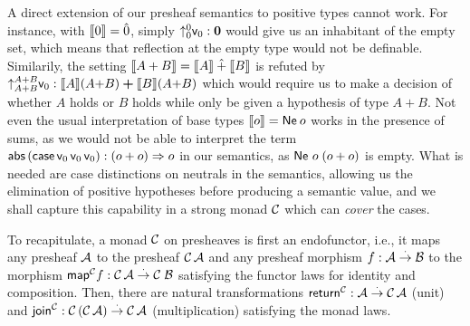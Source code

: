 \documentclass[a4paper,USenglish,cleveref, autoref]{lipics-v2019}
\begin{document}
A direct extension of our presheaf semantics to positive types cannot
work.  For instance, with $\den \tyzero = \hat0$, simply
$\up[\tyzero] \tyzero \vv0 : \bzero$ would give us an
inhabitant of the empty set, which means that reflection at the empty
type would not be definable.  Similarily, the setting
$\den{A + B} = \den A \hatplus \den B$ is refuted by
$\up[A + B]{A + B} \vv0 : \den A (A{+}B) \bplus \den B (A{+}B)$
which would require us to make a decision of whether $A$ holds or $B$ holds
while only be given a hypothesis of type $A + B$.
Not even the usual interpretation of base types $\den o = \tNe\,o$
works in the presence of sums, as we would not be able to interpret
the term
$\tabs\,(\tcase\,\vv0\,\vv0\,\vv0) :
(o+o) \To o$ in our semantics, as $\Ne o (o+o)$ is empty.
What is needed are case distinctions on neutrals in the semantics,
allowing us the elimination of positive hypotheses before producing a
semantic value,
and we shall capture this capability in a strong monad $\C$
which can \emph{cover} the cases.

To recapitulate, a monad $\C$ on presheaves is first an endofunctor,
i.e., it maps any presheaf $\A$ to the presheaf $\C\,\A$ and any
presheaf morphism $f : \A \todot \B$ to the morphism
$\tmap[\C]f: \C\,\A \todot \C\;\B$ satisfying the functor laws for
identity and composition.  Then, there are natural transformations
$\treturn[\C] : \A \todot \C\,\A$ (unit) and
$\tjoin[\C] : \C\,(\C\,\A) \todot \C\,\A$ (multiplication)
satisfying
the monad laws.
\end{document}
